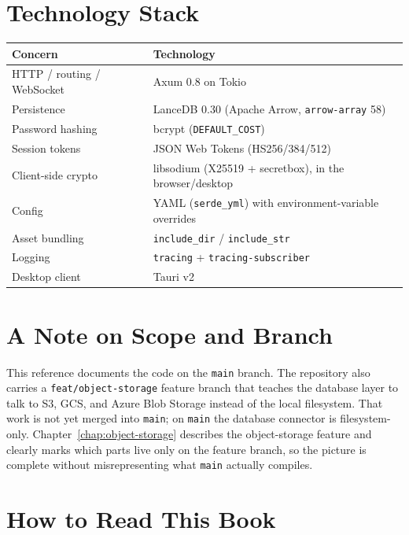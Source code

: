 \section{Technology Stack}

\begin{center}
\begin{tabular}{@{}ll@{}}
\toprule
\textbf{Concern} & \textbf{Technology} \\
\midrule
HTTP / routing / WebSocket & Axum 0.8 on Tokio \\
Persistence & LanceDB 0.30 (Apache Arrow, \verb|arrow-array| 58) \\
Password hashing & bcrypt (\verb|DEFAULT_COST|) \\
Session tokens & JSON Web Tokens (HS256/384/512) \\
Client-side crypto & libsodium (X25519 + secretbox), in the browser/desktop \\
Config & YAML (\verb|serde_yml|) with environment-variable overrides \\
Asset bundling & \verb|include_dir| / \verb|include_str| \\
Logging & \verb|tracing| + \verb|tracing-subscriber| \\
Desktop client & Tauri v2 \\
\bottomrule
\end{tabular}
\end{center}

\section{A Note on Scope and Branch}

This reference documents the code on the \verb|main| branch. The repository also
carries a \verb|feat/object-storage| feature branch that teaches the database
layer to talk to S3, GCS, and Azure Blob Storage instead of the local
filesystem. That work is not yet merged into \verb|main|; on \verb|main| the
database connector is filesystem-only. Chapter~\ref{chap:object-storage}
describes the object-storage feature and clearly marks which parts live only on
the feature branch, so the picture is complete without misrepresenting what
\verb|main| actually compiles.

\section{How to Read This Book}

